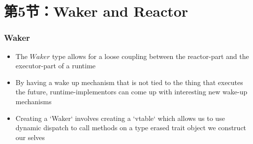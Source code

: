 \section{第5节：Waker and Reactor} %
\begin{frame}[fragile]
    \frametitle{Waker}
% 
% 
% 
% 
    \begin{itemize}
        \item The $Waker$ type allows for a loose coupling between the reactor-part and the executor-part of a runtime \pause
        \item By having a wake up mechanism that is {\color{red}not} tied to the thing that executes the future, runtime-implementors can come up with interesting new wake-up mechanisms \pause
        \item Creating a `Waker` involves creating a `vtable` which allows us to use dynamic dispatch to call methods on a {\color{red}type erased} trait object we construct our selves
    \end{itemize}

\end{frame}
